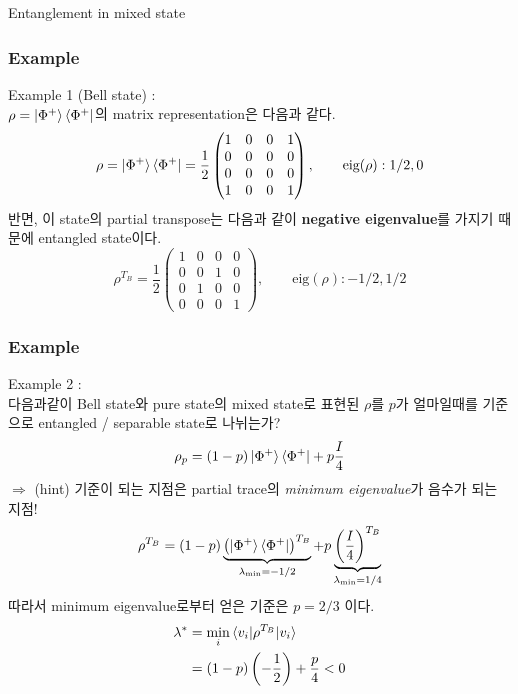 \documentclass[9pt]{beamer}
\begin{document}
\begin{section}{Entanglement in mixed state}
        \begin{frame}
            \frametitle{Example}
            Example 1 (Bell state) : \\
            $\rho = \ket{\Phi^+} \bra{\Phi^+}$의 matrix representation은 다음과 같다.
            \begin{equation*}
                \rho = \ket{\Phi^+} \bra{\Phi^+} = \frac{1}{2} \begin{pmatrix}
                    1 & 0 & 0 & 1 \\
                    0 & 0 & 0 & 0 \\
                    0 & 0 & 0 & 0 \\
                    1 & 0 & 0 & 1
                \end{pmatrix}, \qquad \text{eig}(\rho) : 1/2, 0
            \end{equation*}
            반면, 이 state의 partial transpose는 다음과 같이 \textbf{negative eigenvalue}를 가지기 때문에 entangled state이다.
            \begin{equation*}
                \rho^{T_B} = \frac{1}{2} \begin{pmatrix}
                    1 & 0 & 0 & 0 \\
                    0 & 0 & 1 & 0 \\
                    0 & 1 & 0 & 0 \\
                    0 & 0 & 0 & 1
                \end{pmatrix}, \qquad \text{eig}(\rho) : -1/2, 1/2
            \end{equation*}
        \end{frame}

        \begin{frame}
            \frametitle{Example}
            Example 2 : \\
            다음과같이 Bell state와 pure state의 mixed state로 표현된 $\rho$를 $p$가 얼마일때를 기준으로 entangled / separable state로 나뉘는가?
            \begin{equation*}
                \rho_p = (1-p) \ket{\Phi^+}\bra{\Phi^+} + p \frac{I}{4}
            \end{equation*}
            $\Rightarrow$ (hint) 기준이 되는 지점은 partial trace의 \textit{minimum eigenvalue}가 음수가 되는 지점!
            \begin{equation*}
                \rho^{T_B} = (1-p) \underbrace{\left(\ket{\Phi^+}\bra{\Phi^+}\right)^{T_B}}_{\lambda_{\min} = -1/2} + p \underbrace{\left(\frac{I}{4}\right)^{T_B}}_{\lambda_{\min} = 1/4}
            \end{equation*}
            따라서 minimum eigenvalue로부터 얻은 기준은 $\boxed{p=2/3}$ 이다.
            \begin{align*}
                \lambda^\ast &= \min_{i} \braket{v_i|\rho^{T_B} | v_i} \\
                            &= (1-p) \left(-\frac{1}{2}\right) + \frac{p}{4} < 0
            \end{align*}
        \end{frame}
    \end{section}
\end{document}
